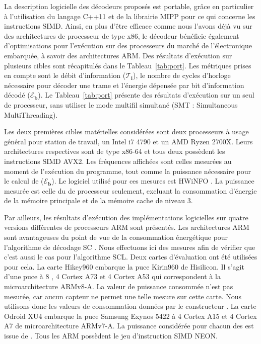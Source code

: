 \begin{table}[t]
{{\begin{tabular}{r|c|c|c c c c| c c c| c c c}
    \end{tabular}
    }}
  \end{table}

La description logicielle des décodeurs proposés est portable, grâce en particulier à l'utilisation du langage C++11 et de la librairie MIPP \cite{cassagne2018mipp} pour ce qui concerne les instructions SIMD. Ainsi, en plus d'être efficace comme nous l'avons déjà vu sur des architectures de processeur de type x86, le décodeur bénéficie également d'optimisations pour l'exécution sur des processeurs du marché de l'électronique embarquée, à savoir des architectures ARM. Des résultats d'exécution sur plusieurs cibles sont récapitulés dans le Tableau~\ref{tab:port}. Les métriques prises en compte sont le débit d'information ($\bm{\mathcal{T}_i}$), le nombre de cycles d'horloge nécessaire pour décoder une trame et l'énergie dépensée par bit d'information décodé ($\bm{\mathcal{E}_b}$). Le Tableau~\ref{tab:port}  présente des résultats d'exécution sur un seul \coeur de processeur, sans utiliser le mode multifil simultané (SMT : Simultaneous MultiThreading).

Les deux premières cibles matérielles considérées sont deux processeurs à usage général pour station de travail, un Intel i7 4790 et un AMD Ryzen 2700X. Leurs architectures respectives sont de type x86-64 et tous deux possèdent les instructions SIMD AVX2. Les fréquences affichées sont celles mesurées au moment de l'exécution du programme, tout comme la puissance nécessaire pour le calcul de ($\bm{\mathcal{E}_b}$). Le logiciel utilisé pour ces mesures est HWiNFO \cite{noauthor_hwinfo_nodate}. La puissance mesurée est celle du \coeur de processeur seulement, excluant la consommation d'énergie de la mémoire principale et de la mémoire cache de niveau 3.

Par ailleurs, les résultats d'exécution des implémentations logicielles sur quatre versions différentes de processeurs ARM sont présentés. Les architectures ARM sont avantageuses du point de vue de la consommation énergétique pour l'algorithme de décodage SC \cite{cassagne_energy_2016}. Nous effectuons ici des mesures afin de vérifier que c'est aussi le cas pour l'algorithme SCL. Deux cartes d'évaluation ont été utilisées pour cela. La carte Hikey960 embarque la puce Kirin960 de Hisilicon. Il s'agit d'une puce à 8 \coeurs, 4 Cortex A73 et 4 Cortex A53 qui correspondent à la microarchitecture ARMv8-A. La valeur de puissance consommée n'est pas mesurée, car aucun capteur ne permet une telle mesure sur cette carte. Nous utilisons donc les valeurs de consommation données par le constructeur \cite{humrick_hisilicon_nodate}. La carte Odroid XU4 embarque la puce Samsung Exynos 5422 à 4 \coeurs Cortex A15 et 4 \coeurs Cortex A7 de microarchitecture ARMv7-A. La puissance considérée pour chacun des \coeurs est issue de \cite{holmgren_energy_nodate,benmoussa_performance_nodate}. Tous les \coeurs ARM possèdent le jeu d'instruction SIMD NEON.

